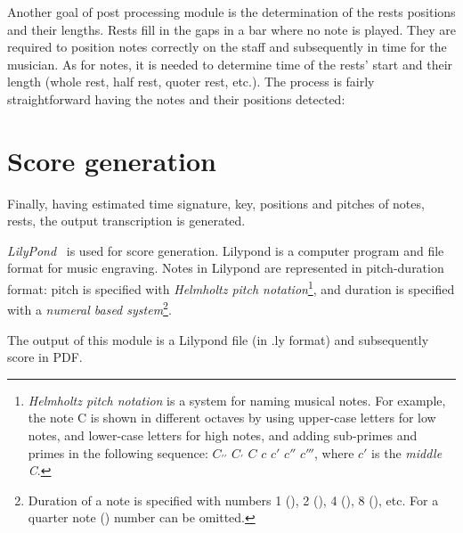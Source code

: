 Another goal of post processing module is the determination of the rests positions and their lengths. Rests fill in
the gaps in a bar where no note is played. They are required to position notes correctly on the staff and subsequently
in time for the musician.
As for notes, it is needed to determine time of the rests' start and their length (whole rest, half rest, quoter rest,
etc.). The process is fairly straightforward having the notes and their positions detected:


\section{Score generation}\label{sec:score-generation}

Finally, having estimated time signature, key, positions and pitches of notes, rests, the output transcription is
generated.

\textit{LilyPond}~\cite{lilypond} is used for score generation. Lilypond is a computer program and file format for music
engraving. Notes in Lilypond are represented in pitch-duration format: pitch is specified with \textit{Helmholtz pitch
notation}\footnote{\textit{Helmholtz pitch notation} is a system for naming musical notes. For example, the note C is
shown in different octaves by using upper-case letters for low notes, and lower-case letters for high notes, and adding
sub-primes and primes in the following sequence: $C_{\prime\prime}$ $C_\prime$ $C$ $c$ $c'$ $c''$ $c'''$, where $c'$ is
the \textit{middle C}.}, and duration is specified with a \textit{numeral based system}\footnote{Duration of a note is
specified with numbers 1 (\Ganz), 2 (\Halb), 4 (\Vier), 8 (\Acht), etc. For a quarter note (\Vier) number can be
omitted.}.

The output of this module is a Lilypond file (in .ly format) and subsequently score in \ac{PDF}.
